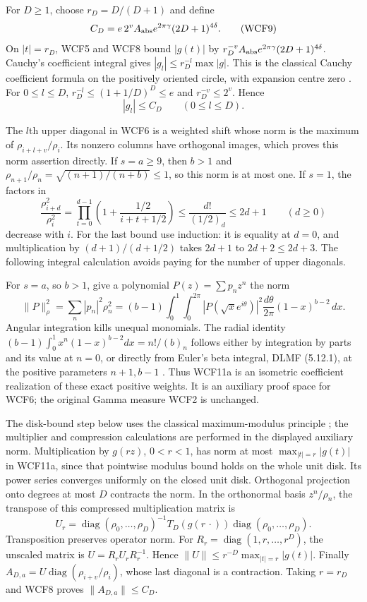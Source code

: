 \documentclass[11pt,a4paper]{article}
\begin{document}
For $D\ge1$, choose $r_D=D/(D+1)$ and define
\[
 C_D=e\,2^v A_{\rm abs}e^{2\pi\gamma}(2D+1)^{4\delta}.
 \tag{WCF9}
\]
On $|t|=r_D$, WCF5 and WCF8 bound $|g(t)|$ by
$r_D^{-v}A_{\rm abs}e^{2\pi\gamma}(2D+1)^{4\delta}$.
Cauchy's coefficient integral gives $|g_l|\le r_D^{-l}\max|g|$.
This is the classical Cauchy coefficient formula on the positively
oriented circle, with expansion centre zero
\cite[eqs.~(1.9.30)--(1.9.31)]{human:dlmf1}.
For $0\le l\le D$, $r_D^{-l}\le(1+1/D)^D\le e$ and
$r_D^{-v}\le2^v$. Hence
\[
 |g_l|\le C_D\qquad(0\le l\le D).
 \tag{WCF10}
\]

The $l$th upper diagonal in WCF6 is a weighted shift whose norm is
the maximum of $\rho_{i+l+v}/\rho_i$. Its nonzero columns have
orthogonal images, which proves this norm assertion directly. If
$s=a\ge9$, then $b>1$ and $\rho_{n+1}/\rho_n=
\sqrt{(n+1)/(n+b)}\le1$, so this norm is at most one.
If $s=1$, the factors in
\[
 \frac{\rho_{i+d}^2}{\rho_i^2}
 =\prod_{t=0}^{d-1}\left(1+\frac{1/2}{i+t+1/2}\right)
 \le\frac{d!}{(1/2)_d}\le2d+1
 \qquad(d\ge0)
 \tag{WCF11}
\]
decrease with $i$. For the last bound use induction: it is equality
at $d=0$, and multiplication by $(d+1)/(d+1/2)$ takes $2d+1$
to $2d+2\le2d+3$. The following integral calculation avoids paying
for the number of upper diagonals.

For $s=a$, so $b>1$, give a polynomial $P(z)=\sum p_nz^n$ the norm
\[
 \|P\|_{\rho}^2=\sum_n|p_n|^2\rho_n^2
  =(b-1)\int_0^1\int_0^{2\pi}|P(\sqrt{x}e^{i\theta})|^2
       \frac{d\theta}{2\pi}(1-x)^{b-2}\,dx.
 \tag{WCF11a}
\]
Angular integration kills unequal monomials. The radial identity
$(b-1)\int_0^1x^n(1-x)^{b-2}dx=n!/(b)_n$ follows either by
integration by parts and its value at $n=0$, or directly from Euler's
beta integral, DLMF (5.12.1), at the positive parameters $n+1,b-1$
\cite{human:dlmf5}. Thus WCF11a is an isometric coefficient
realization of these exact positive weights. It is an auxiliary proof
space for WCF6; the original Gamma measure WCF2 is unchanged.

The disk-bound step below uses the classical maximum-modulus principle
\cite[\S1.10(v)]{human:dlmf1}; the multiplier and compression calculations
are performed in the displayed auxiliary norm.
Multiplication by $g(rz)$, $0<r<1$, has norm at most
$\max_{|t|=r}|g(t)|$ in WCF11a, since that pointwise modulus bound
holds on the whole unit disk. Its power series converges uniformly
on the closed unit disk. Orthogonal projection onto degrees at most
$D$ contracts the norm. In the orthonormal basis $z^n/\rho_n$, the
transpose of this compressed multiplication matrix is
\[
 U_r=\operatorname{diag}(\rho_0,\ldots,\rho_D)^{-1}
            T_D(g(r\,\cdot))\operatorname{diag}(\rho_0,\ldots,\rho_D).
 \tag{WCF11b}
\]
Transposition preserves operator norm. For
$R_r=\operatorname{diag}(1,r,\ldots,r^D)$, the unscaled matrix is
$U=R_rU_rR_r^{-1}$. Hence
$\|U\|\le r^{-D}\max_{|t|=r}|g(t)|$. Finally
$A_{D,a}=U\operatorname{diag}(\rho_{i+v}/\rho_i)$, whose last
diagonal is a contraction. Taking $r=r_D$ and WCF8 proves
$\|A_{D,a}\|\le C_D$.
\end{document}
